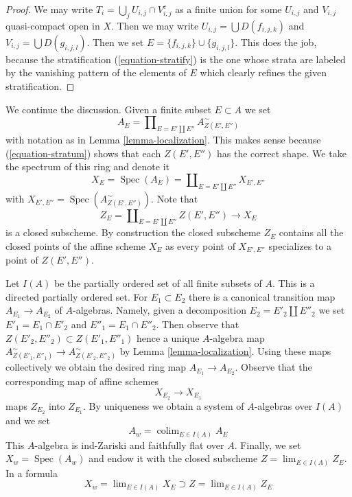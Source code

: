 \documentclass[10pt,a4paper]{article}
\theoremstyle{plain}
\theoremstyle{definition}
\theoremstyle{remark}
\numberwithin{equation}{subsection}
\def\lim{\mathop{\mathrm{lim}}\nolimits}
\def\colim{\mathop{\mathrm{colim}}\nolimits}
\def\Spec{\mathop{\mathrm{Spec}}}
\begin{document}
\begin{proof}
We may write $T_i = \bigcup_j U_{i, j} \cap V_{i, j}^c$ as a finite union
for some $U_{i, j}$ and $V_{i, j}$ quasi-compact open in $X$.
Then we may write $U_{i, j} = \bigcup D(f_{i, j, k})$ and
$V_{i, j} = \bigcup D(g_{i, j, l})$. Then we set
$E = \{f_{i, j, k}\} \cup \{g_{i, j, l}\}$. This does the job, because
the stratification (\ref{equation-stratify}) is the one whose strata are
labeled by the vanishing pattern of the elements of $E$ which
clearly refines the given stratification.
\end{proof}

\noindent
We continue the discussion.
Given a finite subset $E \subset A$ we set
\begin{equation}
\label{equation-ring}
A_E = \prod\nolimits_{E = E' \amalg E''} A_{Z(E', E'')}^\sim
\end{equation}
with notation as in Lemma \ref{lemma-localization}. This makes sense because
(\ref{equation-stratum}) shows that each $Z(E', E'')$ has the correct shape.
We take the spectrum of this ring and denote it
\begin{equation}
\label{equation-spectrum}
X_E = \Spec(A_E) = \coprod\nolimits_{E = E' \amalg E''} X_{E', E''}
\end{equation}
with $X_{E', E''} = \Spec(A_{Z(E', E'')}^\sim)$. Note that
\begin{equation}
\label{equation-closed}
Z_E = \coprod\nolimits_{E = E' \amalg E''} Z(E', E'')
\longrightarrow
X_E
\end{equation}
is a closed subscheme. By construction the closed subscheme $Z_E$
contains all the closed points of the affine scheme $X_E$ as every point
of $X_{E', E''}$ specializes to a point of $Z(E', E'')$.

\medskip\noindent
Let $I(A)$ be the partially ordered set of all finite subsets of $A$.
This is a directed partially ordered set. For $E_1 \subset E_2$ there
is a canonical transition map $A_{E_1} \to A_{E_2}$ of $A$-algebras.
Namely, given a decomposition $E_2 = E'_2 \amalg E''_2$ we set
$E'_1 = E_1 \cap E'_2$ and $E''_1 = E_1 \cap E''_2$. Then observe that
$Z(E'_2, E''_2) \subset Z(E'_1, E''_1)$ hence a unique $A$-algebra map
$A_{Z(E'_1, E''_1)}^\sim \to A_{Z(E'_2, E''_2)}^\sim$ by
Lemma \ref{lemma-localization}. Using these maps collectively we obtain
the desired ring map $A_{E_1} \to A_{E_2}$. Observe that the corresponding
map of affine schemes
\begin{equation}
\label{equation-transition}
X_{E_2} \longrightarrow X_{E_1}
\end{equation}
maps $Z_{E_2}$ into $Z_{E_1}$. By uniqueness we obtain a system of
$A$-algebras over $I(A)$ and we set
\begin{equation}
\label{equation-colimit-ring}
A_w = \colim_{E \in I(A)} A_E
\end{equation}
This $A$-algebra is ind-Zariski and faithfully flat over $A$.
Finally, we set $X_w = \Spec(A_w)$ and endow it with the closed subscheme
$Z = \lim_{E \in I(A)} Z_E$. In a formula
\begin{equation}
\label{equation-final}
X_w = \lim_{E \in I(A)} X_E \supset Z = \lim_{E \in I(A)} Z_E
\end{equation}
\end{document}

